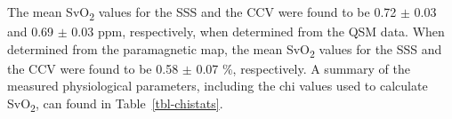 \documentclass[
sn-nature
]{sn-jnl}
\begin{document}
\begin{table}

\caption{\label{tbl-dem}Demographic and clinical characteristic of the
study sample.}


\end{table}%

The mean SvO\textsubscript{2} values for the SSS and the CCV were found
to be 0.72 \(\pm\) 0.03 and 0.69 \(\pm\) 0.03 ppm, respectively, when
determined from the QSM data. When determined from the paramagnetic map,
the mean SvO\textsubscript{2} values for the SSS and the CCV were found
to be 0.58 \(\pm\) 0.07 \%, respectively. A summary of the measured
physiological parameters, including the chi values used to calculate
SvO\textsubscript{2}, can found in Table~\ref{tbl-chistats}.
\end{document}
